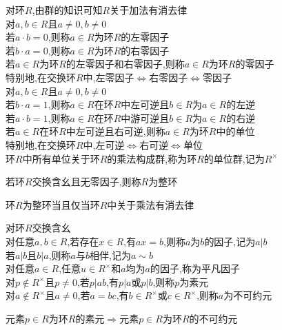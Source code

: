\begin{dingyi}
对环$R$,由群的知识可知$R$关于加法有消去律\\
对$a,b\in R$且$a\neq 0,b\neq 0$\\
若$a\cdot b=0$,则称$a\in R$为环$R$的左零因子\\
若$b\cdot a=0$,则称$a\in R$为环$R$的右零因子\\
若$a\in R$为环$R$的左零因子和右零因子,则称$a\in R$为环$R$的零因子\\
特别地,在交换环$R$中,左零因子$\Leftrightarrow$右零因子$\Leftrightarrow$零因子\\
对$a,b\in R$且$a\neq 0,b\neq 0$\\
若$b\cdot a=1$,则称$a\in R$在环$R$中左可逆且$b\in R$为$a\in R$的左逆\\
若$a\cdot b=1$,则称$a\in R$在环$R$中游可逆且$b\in R$为$a\in R$的右逆\\
若$a\in R$在环$R$中左可逆且右可逆,则称$a\in R$为环$R$中的单位\\
特别地,在交换环$R$中,左可逆$\Leftrightarrow$右可逆$\Leftrightarrow$单位\\
环$R$中所有单位关于环$R$的乘法构成群,称为环$R$的单位群,记为$R^{\times}$
\end{dingyi}

\begin{dingyi}
若环$R$交换含幺且无零因子,则称$R$为整环
\end{dingyi}

\begin{tuilun}
环$R$为整环当且仅当环$R$中关于乘法有消去律
\end{tuilun}

\begin{dingyi}
对环$R$交换含幺\\
对任意$a,b\in R$,若存在$x\in R$,有$ax=b$,则称$a$为$b$的因子,记为$a|b$\\
若$a|b$且$b|a$,则称$a$与$b$相伴,记为$a\sim b$\\
对任意$a\in R$,任意$u\in R^{\times}$和$a$均为$a$的因子,称为平凡因子\\
对$p\notin R^{\times}$且$p\neq 0$,若$p|ab$,有$p|a$或$p|b$,则称$p$为素元\\
对$a\notin R^{\times}$且$a\neq 0$,若$a=bc$,有$b\in R^{\times}$或$c\in R^{\times}$,则称$a$为不可约元
\end{dingyi}

\begin{tuilun}
元素$p\in R$为环$R$的素元$\Rightarrow$元素$p\in R$为环$R$的不可约元
\end{tuilun}

